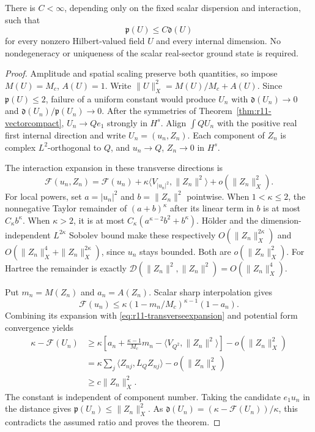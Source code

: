 \begin{theorem}
\label{thm:r11-quantitativepolarization}
There is $C<\infty$, depending only on the fixed scalar dispersion
and interaction, such that
\begin{equation}\label{eq:r11-polarizationdeficit}
 \mathfrak p(U)\le C\mathfrak d(U)
\end{equation}
for every nonzero Hilbert-valued field $U$ and every internal dimension.
No nondegeneracy or uniqueness of the scalar real-sector ground state
is required.
\end{theorem}
\begin{proof}
Amplitude and spatial scaling preserve both quantities, so impose
$M(U)=M_c$, $A(U)=1$. Write
$\|U\|_X^2=M(U)/M_c+A(U)$.
Since $\mathfrak p(U)\le2$, failure of a uniform constant would
produce $U_n$ with $\mathfrak d(U_n)\to0$ and
$\mathfrak d(U_n)/\mathfrak p(U_n)\to0$.
After the symmetries of Theorem~\ref{thm:r11-vectorcompact},
$U_n\to Qe_1$ strongly in $H^s$.
Align $\int QU_n$ with the positive real first internal direction
and write $U_n=(u_n,Z_n)$. Each component of $Z_n$ is complex
$L^2$-orthogonal to $Q$, and $u_n\to Q$, $Z_n\to0$ in $H^s$.

The interaction expansion in these transverse directions is
\begin{equation}\label{eq:r11-transverseexpansion}
 \mathcal F(u_n,Z_n)=\mathcal F(u_n)
 +\kappa\langle V_{|u_n|^2},\|Z_n\|^2\rangle
 +o(\|Z_n\|_X^2).
\end{equation}
For local powers, set $a=|u_n|^2$ and $b=\|Z_n\|^2$ pointwise.
When $1<\kappa\le2$, the nonnegative Taylor remainder of
$(a+b)^\kappa$ after its linear term in $b$ is at most $C_\kappa b^\kappa$.
When $\kappa>2$, it is at most
$C_\kappa(a^{\kappa-2}b^2+b^\kappa)$.
H\"older and the dimension-independent $L^{2\kappa}$ Sobolev bound
make these respectively $O(\|Z_n\|_X^{2\kappa})$ and
$O(\|Z_n\|_X^4+\|Z_n\|_X^{2\kappa})$, since $u_n$ stays bounded.
Both are $o(\|Z_n\|_X^2)$.
For Hartree the remainder is exactly
$\mathcal D(\|Z_n\|^2,\|Z_n\|^2)=O(\|Z_n\|_X^4)$.

Put $m_n=M(Z_n)$ and $a_n=A(Z_n)$. Scalar sharp interpolation gives
\[
 \mathcal F(u_n)\le
 \kappa(1-m_n/M_c)^{\kappa-1}(1-a_n).
\]
Combining its expansion with \eqref{eq:r11-transverseexpansion}
and potential form convergence yields
\begin{align*}
 \kappa-\mathcal F(U_n)
 &\ge\kappa\left[
 a_n+\frac{\kappa-1}{M_c}m_n
       -\langle V_{Q^2},\|Z_n\|^2\rangle\right]
       -o(\|Z_n\|_X^2)\\
 &=\kappa\sum_j\langle Z_{nj},L_QZ_{nj}\rangle
       -o(\|Z_n\|_X^2)\\
 &\ge c\|Z_n\|_X^2.
\end{align*}
The constant is independent of component number. Taking the candidate
$e_1u_n$ in the distance gives
$\mathfrak p(U_n)\le\|Z_n\|_X^2$.
As $\mathfrak d(U_n)=(\kappa-\mathcal F(U_n))/\kappa$,
this contradicts the assumed ratio and proves the theorem.
\end{proof}

